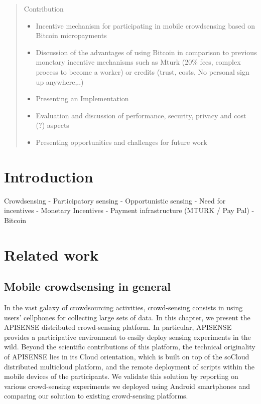 \documentclass{sig-alternate}
\begin{document}
\maketitle
\begin{abstract}
Contribution
\begin{itemize}
\item Incentive mechanism for participating in mobile crowdsensing based on Bitcoin micropayments
\item Discussion of the advantages of using Bitcoin in comparison to previous monetary incentive mechanisms such as Mturk (20\% fees, complex process to become a worker) or credits (trust, costs, No personal sign up anywhere,..)
\item Presenting an Implementation
\item Evaluation and discussion of performance, security, privacy and cost (?) aspects
\item Presenting opportunities and challenges for future work
\end{itemize}

\end{abstract}




\section{Introduction}
Crowdsensing - Participatory sensing - Opportunistic sensing - Need for incentives - Monetary Incentives - Payment infrastructure (MTURK / Pay Pal) - Bitcoin

\section{Related work}

\subsection{Mobile crowdsensing in general}

In the vast galaxy of crowdsourcing activities, crowd-sensing consists in
using users’ cellphones for collecting large sets of data. In this chapter, we present the
APISENSE distributed crowd-sensing platform. In particular, APISENSE provides a
participative environment to easily deploy sensing experiments in the wild. Beyond
the scientific contributions of this platform, the technical originality of APISENSE
lies in its Cloud orientation, which is built on top of the soCloud distributed multicloud
platform, and the remote deployment of scripts within the mobile devices of
the participants. We validate this solution by reporting on various crowd-sensing
experiments we deployed using Android smartphones and comparing our solution
to existing crowd-sensing platforms. \cite{Haderer:2015bx}
\end{document}
